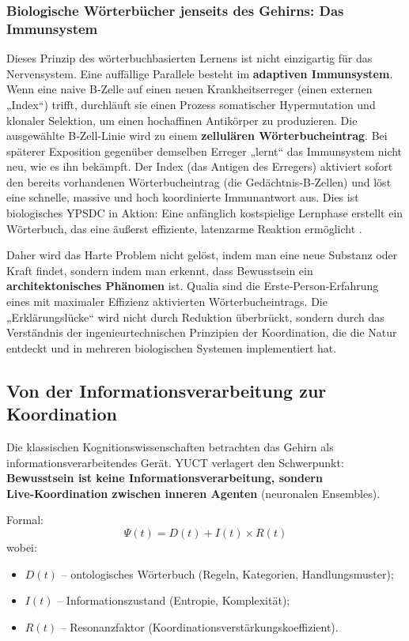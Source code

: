 \documentclass[12pt,a4paper]{article}
\begin{document}
	\subsubsection{Biologische Wörterbücher jenseits des Gehirns: Das Immunsystem}
	
	Dieses Prinzip des wörterbuchbasierten Lernens ist nicht einzigartig für das Nervensystem. Eine auffällige Parallele besteht im \textbf{adaptiven Immunsystem}. Wenn eine naive B‑Zelle auf einen neuen Krankheitserreger (einen externen „Index“) trifft, durchläuft sie einen Prozess somatischer Hypermutation und klonaler Selektion, um einen hochaffinen Antikörper zu produzieren. Die ausgewählte B‑Zell‑Linie wird zu einem \textbf{zellulären Wörterbucheintrag}. Bei späterer Exposition gegenüber demselben Erreger „lernt“ das Immunsystem nicht neu, wie es ihn bekämpft. Der Index (das Antigen des Erregers) aktiviert sofort den bereits vorhandenen Wörterbucheintrag (die Gedächtnis‑B‑Zellen) und löst eine schnelle, massive und hoch koordinierte Immunantwort aus. Dies ist biologisches YPSDC in Aktion: Eine anfänglich kostspielige Lernphase erstellt ein Wörterbuch, das eine äußerst effiziente, latenzarme Reaktion ermöglicht \cite{Alberts2014}.
	
	Daher wird das Harte Problem nicht gelöst, indem man eine neue Substanz oder Kraft findet, sondern indem man erkennt, dass Bewusstsein ein \textbf{architektonisches Phänomen} ist. Qualia sind die Erste‑Person‑Erfahrung eines mit maximaler Effizienz aktivierten Wörterbucheintrags. Die „Erklärungslücke“ wird nicht durch Reduktion überbrückt, sondern durch das Verständnis der ingenieurtechnischen Prinzipien der Koordination, die die Natur entdeckt und in mehreren biologischen Systemen implementiert hat.
	
	\subsection{Von der Informationsverarbeitung zur Koordination}
	
	Die klassischen Kognitionswissenschaften betrachten das Gehirn als informationsverarbeitendes Gerät. YUCT verlagert den Schwerpunkt: \textbf{Bewusstsein ist keine Informationsverarbeitung, sondern Live‑Koordination zwischen inneren Agenten} (neuronalen Ensembles).
	
	Formal:
	\[
	\Psi(t) = D(t) + I(t) \times R(t)
	\]
	wobei:
	\begin{itemize}
		\item $D(t)$ – ontologisches Wörterbuch (Regeln, Kategorien, Handlungsmuster);
		\item $I(t)$ – Informationszustand (Entropie, Komplexität);
		\item $R(t)$ – Resonanzfaktor (Koordinationsverstärkungskoeffizient).
	\end{itemize}
	
\end{document}
